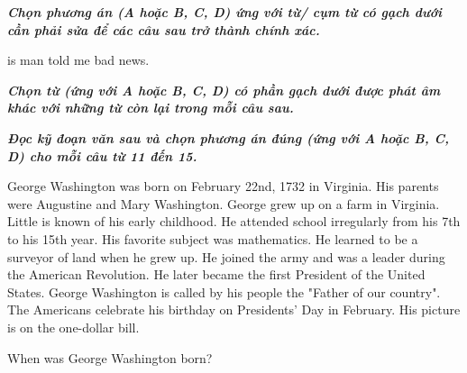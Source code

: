 \documentclass[11pt]{article}
\newcommand{\tieude}[1]{\par{\itshape\textbf{#1}}}
\begin{document}
\setlength{\baselineskip}{12truept}
 \begin{multiplechoice}[ keycolumns=3]
 \tieude{Chọn phương án (A hoặc B, C, D) ứng với từ/ cụm từ có gạch dưới cần phải sửa để các câu sau trở thành chính xác.}%
\begin{question}
 is  man  told me  bad news.
\datcot
\bonpah
{}
{} 
{} 
{}
\end{question}

\foreachproblem[btsuatu]{\thisproblem}

\end{multiplechoice}


 \begin{multiplechoice}[ keycolumns=3]
\tieude{Chọn từ (ứng với A hoặc B, C, D) có phần gạch dưới được phát âm khác với những từ còn lại trong mỗi câu sau.}%
\begin{question}
\datcot
\bonpat
{} 
{} 
{} 
{}
\end{question}
\foreachproblem[btchontu]{\label{prob:\thisproblemlabel}\thisproblem}
\end{multiplechoice}

 \begin{multiplechoice}[ keycolumns=3]
\tieude{Đọc kỹ đoạn văn sau và chọn phương án đúng (ứng với A hoặc B, C, D) cho mỗi câu từ 11 đến 15.}%

George Washington was born on February 22nd, 1732 in Virginia. His parents were Augustine and Mary Washington. George grew up on a farm in Virginia. Little is known of his early childhood. He attended school irregularly from his 7th to his 15th year. His favorite subject was mathematics. He learned to be a surveyor of land when he grew up. He joined the army and was a leader during the American Revolution. He later became the first President of the United States. George Washington is called by his people the "Father of our country". The Americans celebrate his birthday on Presidents' Day in February. His picture is on the one-dollar bill.
\begin{question}
When was George Washington born?
\datcot
\bonpa
{} 
{} 
{} 
{}
\end{question}

\foreachproblem[btdungtu]{\label{prob:\thisproblemlabel}\thisproblem}
\end{multiplechoice}
\end{document}
